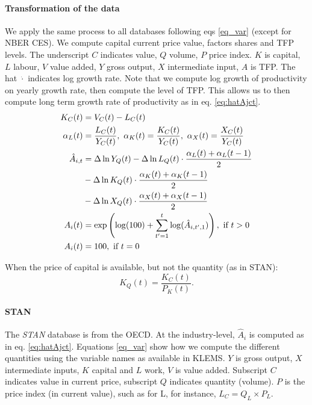 \paragraph{Transformation of the data} We apply the same process to all databases following eqs \ref{eq_var} (except for NBER CES). We compute capital current price value, factors shares and TFP levels. The underscript $C$ indicates value, $Q$ volume, $P$ price index. $K$ is capital, $L$ labour, $V$ value added, $Y$ gross output, $X$ intermediate input, $A$ is TFP. The hat $\hat{\cdot}$ indicates log growth rate. Note that we compute log growth of productivity on yearly growth rate, then compute the level of TFP. This allows us to then compute long term growth rate of productivity as in eq. \ref{eq:hatAjct}.
\begin{align}
\label{eq_var}
    K_C(t)&=V_C(t)-L_C(t)\\
    \alpha_L(t)&=\frac{L_C(t)}{Y_C(t)},~
    \alpha_K(t)=\frac{K_C(t)}{Y_C(t)},~
    \alpha_X(t)=\frac{X_C(t)}{Y_C(t)}\\
    \label{eq_aihat_go}
    \hat{A}_{i,t}&=
     \Delta \ln Y_Q(t)- 
     \Delta \ln L_Q(t) \cdot \frac{\alpha_L(t)+\alpha_L(t-1)}{2} \notag\\&-
    \Delta \ln K_Q(t) \cdot \frac{\alpha_K(t)+\alpha_K(t-1)}{2} \notag\\&-
     \Delta \ln X_Q(t) \cdot \frac{\alpha_X(t)+\alpha_X(t-1)}{2}\\
         A_i(t) &= \exp\left(\log(100) + \sum_{t'=1}^{t} \log(\hat{A}_{i,t',1})\right), ~\text{if~} t>0\\
         A_i(t) &= 100, ~\text{if~} t=0
\end{align}

When the price of capital is available, but not the quantity (as in STAN): 
\begin{equation}
     K_Q(t)=\frac{K_C(t)}{P_K(t)}.
\end{equation}


\paragraph{STAN} The \textit{STAN} database is from the OECD. At the industry-level, $\hat{A}_i$ is computed as in eq. \ref{eq:hatAjct}. Equations \ref{eq_var} show how we compute the different quantities using the variable names as available in KLEMS. $Y$ is gross output, $X$ intermediate inputs, $K$ capital and $L$ work, $V$ is value added. Subscript $C$ indicates value in current price, subscript $Q$ indicates quantity (volume). $P$ is the price index (in current value), such as for L, for instance, $L_C=Q_L\times P_L$.

